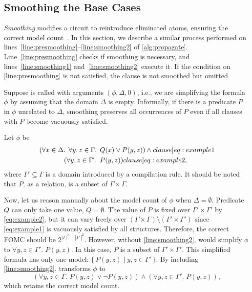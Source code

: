 \documentclass[a4paper,UKenglish,cleveref, autoref, thm-restate]{lipics-v2021}
\begin{document}
\subsection{Smoothing the Base Cases}\label{sec:smoothing}

\emph{Smoothing} modifies a circuit to reintroduce eliminated atoms, ensuring
the correct model
count~\cite{darwiche2001tractable,DBLP:conf/ijcai/BroeckTMDR11}. In this
section, we describe a similar process performed on
lines~\ref{line:presmoothing}--\ref{line:smoothing2} of \cref{alg:propagate}.
Line~\ref{line:presmoothing} checks if smoothing is necessary, and
lines~\ref{line:smoothing1} and~\ref{line:smoothing2} execute it. If the
condition on \autoref{line:presmoothing} is not satisfied, the clause is not
smoothed but omitted.

Suppose \Propagate is called with arguments $(\phi, \Delta, 0)$, i.e., we are
simplifying the formula $\phi$ by assuming that the domain $\Delta$ is empty.
Informally, if there is a predicate $P$ in $\phi$ unrelated to $\Delta$,
smoothing preserves all occurrences of $P$ even if all clauses with $P$ become
vacuously satisfied.

\begin{example}\label{example:basecasesmoothing}
  Let $\phi$ be
  \begin{align}
    (\forall x \in \Delta\text{. }\forall y, z \in \Gamma&\text{. }Q(x) \lor P(y, z))\land{}\label[clause]{eq:example1}\\
    (\forall y, z \in \Gamma'&\text{. }P(y, z))\label[clause]{eq:example2},
  \end{align}
  where $\Gamma' \subseteq \Gamma$ is a domain introduced by a compilation rule.
  It should be noted that $P$, as a relation, is a subset of
  $\Gamma \times \Gamma$.

  Now, let us reason manually about the model count of $\phi$ when
  $\Delta = \emptyset$. Predicate $Q$ can only take one value, $Q = \emptyset$.
  The value of $P$ is fixed over $\Gamma' \times \Gamma'$ by \cref{eq:example2},
  but it can vary freely over
  $(\Gamma \times \Gamma) \setminus (\Gamma' \times \Gamma')$ since
  \cref{eq:example1} is vacuously satisfied by all structures. Therefore, the
  correct FOMC should be $2^{|\Gamma|^2 - |\Gamma'|^2}$. However, without
  \autoref{line:smoothing2}, \Propagate would simplify $\phi$ to
  $\forall y, z \in \Gamma'\text{. }P(y, z)$. In this case, $P$ is a subset of
  $\Gamma' \times \Gamma'$. This simplified formula has only one model:
  $\{\, P(y, z) \mid y, z \in \Gamma' \,\}$. By including
  \autoref{line:smoothing2}, \Propagate transforms $\phi$ to
  \[
    (\forall y, z \in \Gamma\text{. }P(y, z) \lor \neg P(y, z)) \land (\forall y, z \in \Gamma'\text{. }P(y, z)),
  \]
  which retains the correct model count.
\end{example}
\end{document}
